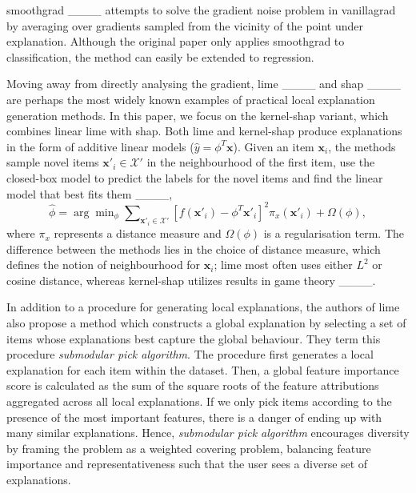 {\sc smoothgrad} ____ attempts to solve the gradient noise problem in {\sc vanillagrad} by averaging over gradients sampled from the vicinity of the point under explanation.
Although the original paper only applies {\sc smoothgrad} to classification, the method can easily be extended to regression. 

Moving away from directly analysing the gradient, {\sc lime} ____ and {\sc shap} ____ are perhaps the most widely known examples of practical local explanation generation methods.
In this paper, we focus on the {\sc kernel-shap} variant, which combines linear {\sc lime} with {\sc shap}.
Both {\sc lime} and {\sc kernel-shap} produce explanations in the form of additive linear models ($\hat{y} = \phi^T \bm{x}$).
Given an item $\bm{x}_i$, the methods sample novel items $\bm{x}'_i \in \mathcal{X}'$ in the neighbourhood of the first item, use the closed-box model to predict the labels for the novel items and find the linear model that best fits them ____,
\begin{equation}
    \hat{\phi} = \arg \min\nolimits_{\phi} \sum\nolimits_{\bm{x}'_i \in \mathcal{X}'} [f(\bm{x}'_i) - \phi^T \bm{x}'_i]^2 \pi_x(\bm{x}'_i) + \Omega(\phi),
\end{equation}
where $\pi_x$ represents a distance measure and $\Omega(\phi)$ is a regularisation term.
The difference between the methods lies in the choice of distance measure, which defines the notion of neighbourhood for $\bm{x}_i$; {\sc lime} most often uses either $L^2$ or cosine distance, whereas {\sc kernel-shap} utilizes results in game theory ____.

In addition to a procedure for generating local explanations, the authors of {\sc lime} also propose a method which constructs a global explanation by selecting a set of items whose explanations best capture the global behaviour.
They term this procedure \emph{submodular pick algorithm}.
The procedure first generates a local explanation for each item within the dataset. 
Then, a global feature importance score is calculated as the sum of the square roots of the feature attributions aggregated across all local explanations.
If we only pick items according to the presence of the most important features, there is a danger of ending up with many similar explanations.
Hence, \emph{submodular pick algorithm} encourages diversity by framing the problem as a weighted covering problem, balancing feature importance and representativeness such that the user sees a diverse set of explanations.

